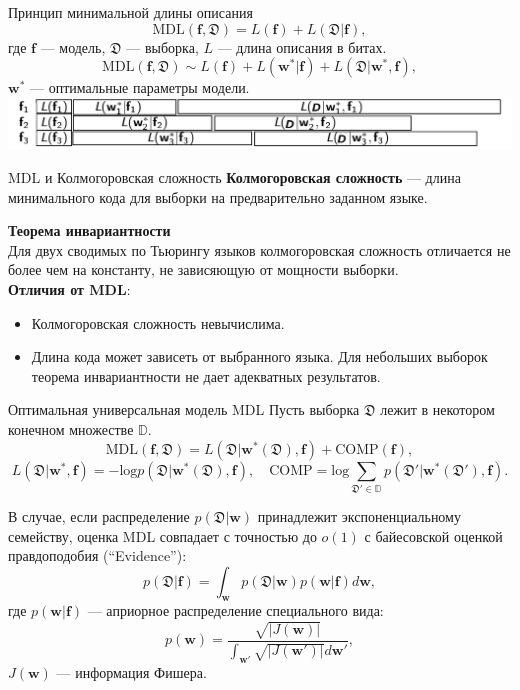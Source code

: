 \documentclass[10pt,pdf,utf8,russian,aspectratio=169]{beamer}
\begin{document}
\begin{frame}{Принцип минимальной длины описания}
\[
\text{MDL}(\mathbf{f}, \mathfrak{D}) = L(\mathbf{f}) + L(\mathfrak{D}|\mathbf{f}),
\]
где $\mathbf{f}$ --- модель, $\mathfrak{D}$ --- выборка, $L$ --- длина описания в битах.
\\
\[
\text{MDL}(\mathbf{f}, \mathfrak{D}) \sim L(\mathbf{f}) + L(\mathbf{w}^*| \mathbf{f}) + L(\mathfrak{D}|\mathbf{w}^*, \mathbf{f}),
\]
$\mathbf{w}^*$ --- оптимальные параметры модели.\\

\includegraphics[width=\textwidth]{./mdl.png}

\end{frame}

\begin{frame}{MDL и Колмогоровская сложность}
\textbf{Колмогоровская сложность} --- длина минимального кода для выборки на предварительно заданном языке.

\textbf{Теорема инвариантности}\\
Для двух сводимых по Тьюрингу языков колмогоровская сложность  отличается не более чем на константу, не зависяющую от мощности выборки.\\

\textbf{Отличия от MDL}:
\begin{itemize}
\item Колмогоровская сложность невычислима.
\item Длина кода может зависеть от выбранного языка. Для небольших выборок теорема инвариантности не дает адекватных результатов.
\end{itemize}
\end{frame}

\begin{frame}{Оптимальная универсальная модель MDL}
Пусть выборка $\mathfrak{D}$ лежит в некотором конечном множестве $\mathbb{D}$.
\[
\text{MDL}(\mathbf{f}, \mathfrak{D}) = L(\mathfrak{D}|\mathbf{w}^*(\mathfrak{D}), \mathbf{f}) + \text{COMP}(\mathbf{f}),
\]
$$ L(\mathfrak{D}|\mathbf{w}^*, \mathbf{f}) = -\text{log}p(\mathfrak{D}|\mathbf{w}^*(\mathfrak{D}), \mathbf{f}), \quad 
\text{COMP} = \text{log} \sum_{\mathfrak{D}' \in \mathbb{D}} p(\mathfrak{D}'|\mathbf{w}^*(\mathfrak{D}'), \mathbf{f}).$$

В случае, если распределение $p(\mathfrak{D}|\mathbf{w})$ принадлежит экспоненциальному семейству, оценка MDL совпадает с точностью до $o(1)$ с байесовской оценкой правдоподобия (``Evidence''):
\[
	p(\mathfrak{D}|\mathbf{f}) = \int_\mathbf{w} p(\mathfrak{D}|\mathbf{w})p(\mathbf{w}|\mathbf{f}) d\mathbf{w},
\]
где $p(\mathbf{w}|\mathbf{f})$ --- априорное распределение специального вида:
$$
	p(\mathbf{w}) = \frac{\sqrt{|J(\mathbf{w})|}}{\int_{\mathbf{w}'} \sqrt{|J(\mathbf{w'})|}d\mathbf{w'}},
$$
$J(\mathbf{w})$  --- информация Фишера.
\end{frame}	
\end{document}
